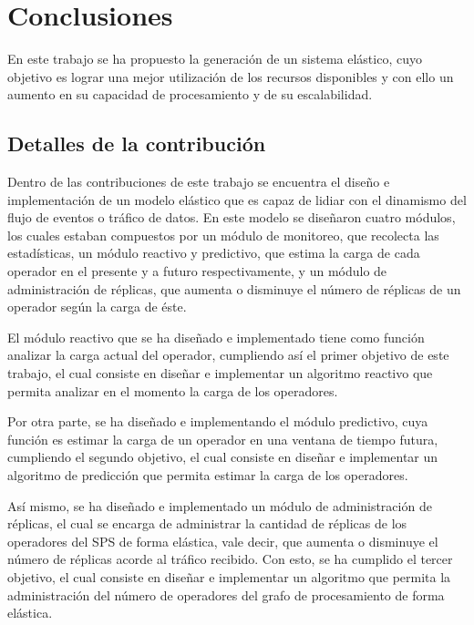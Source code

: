 \chapter{Conclusiones}
\label{cap:conclusiones}
En este trabajo se ha propuesto la generación de un sistema elástico, cuyo objetivo es lograr una mejor utilización de los recursos disponibles y con ello un aumento en su capacidad de procesamiento y de su escalabilidad.

\section{Detalles de la contribución}
Dentro de las contribuciones de este trabajo se encuentra el diseño e implementación de un modelo elástico que es capaz de lidiar con el dinamismo del flujo de eventos o tráfico de datos. En este modelo se diseñaron cuatro módulos, los cuales estaban compuestos por un módulo de monitoreo, que recolecta las estadísticas, un módulo reactivo y predictivo, que estima la carga de cada operador en el presente y a futuro respectivamente, y un módulo de administración de réplicas, que aumenta o disminuye el número de réplicas de un operador según la carga de éste.

El módulo reactivo que se ha diseñado e implementado tiene como función analizar la carga actual del operador, cumpliendo así el primer objetivo de este trabajo, el cual consiste en dise\~nar e implementar un algoritmo reactivo que permita analizar en el momento la carga de los operadores.

Por otra parte, se ha diseñado e implementando el módulo predictivo, cuya función es estimar la carga de un operador en una ventana de tiempo futura, cumpliendo el segundo objetivo, el cual consiste en dise\~nar e implementar un algoritmo de predicci\'on que permita estimar la carga de los operadores.

Así mismo, se ha diseñado e implementado un módulo de administración de réplicas, el cual se encarga de administrar la cantidad de réplicas de los operadores del SPS de forma elástica, vale decir, que aumenta o disminuye el número de réplicas acorde al tráfico recibido. Con esto, se ha cumplido el tercer objetivo, el cual consiste en dise\~nar e implementar un algoritmo que permita la administraci\'on del número de operadores del grafo de procesamiento de forma el\'astica.


